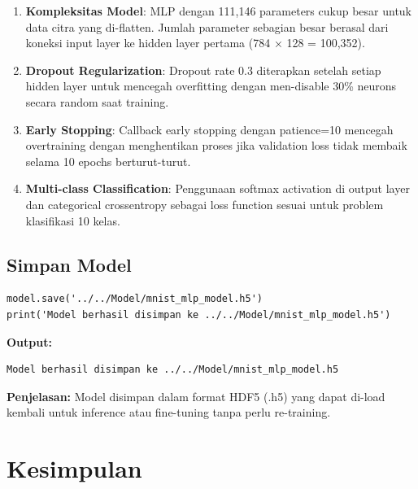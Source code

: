 \documentclass[12pt,a4paper]{article}
\begin{document}
\begin{enumerate}
    \item \textbf{Kompleksitas Model}: MLP dengan 111,146 parameters cukup besar untuk data citra yang di-flatten. Jumlah parameter sebagian besar berasal dari koneksi input layer ke hidden layer pertama (784 × 128 = 100,352).
    
    \item \textbf{Dropout Regularization}: Dropout rate 0.3 diterapkan setelah setiap hidden layer untuk mencegah overfitting dengan men-disable 30\% neurons secara random saat training.
    
    \item \textbf{Early Stopping}: Callback early stopping dengan patience=10 mencegah overtraining dengan menghentikan proses jika validation loss tidak membaik selama 10 epochs berturut-turut.
    
    \item \textbf{Multi-class Classification}: Penggunaan softmax activation di output layer dan categorical crossentropy sebagai loss function sesuai untuk problem klasifikasi 10 kelas.
\end{enumerate}

\subsection{Simpan Model}

\begin{lstlisting}[caption=Save Model]
model.save('../../Model/mnist_mlp_model.h5')
print('Model berhasil disimpan ke ../../Model/mnist_mlp_model.h5')
\end{lstlisting}

\textbf{Output:}
\begin{verbatim}
Model berhasil disimpan ke ../../Model/mnist_mlp_model.h5
\end{verbatim}

\textbf{Penjelasan:} Model disimpan dalam format HDF5 (.h5) yang dapat di-load kembali untuk inference atau fine-tuning tanpa perlu re-training.

\section{Kesimpulan}
\end{document}
